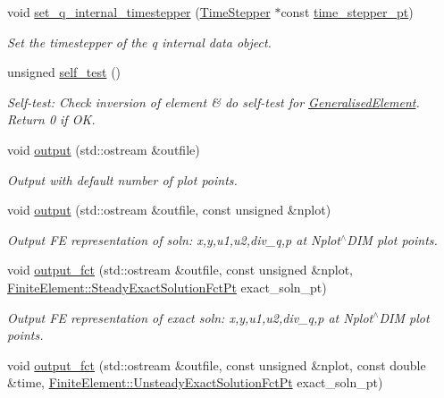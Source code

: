 \begin{DoxyCompactItemize}
void \hyperlink{classoomph_1_1PoroelasticityEquations_a9fe9f9e43dd7a2f93753c5d0e882b2c8}{set\+\_\+q\+\_\+internal\+\_\+timestepper} (\hyperlink{classoomph_1_1TimeStepper}{Time\+Stepper} $\ast$const \hyperlink{classoomph_1_1GeomObject_a3c92023891dd4a0e818022f467eeb7f1}{time\+\_\+stepper\+\_\+pt})
\begin{DoxyCompactList}\small\item\em Set the timestepper of the q internal data object. \end{DoxyCompactList}\item 
unsigned \hyperlink{classoomph_1_1PoroelasticityEquations_ad655780a10fff85d3d0b87738decfb4d}{self\+\_\+test} ()
\begin{DoxyCompactList}\small\item\em Self-\/test\+: Check inversion of element \& do self-\/test for \hyperlink{classoomph_1_1GeneralisedElement}{Generalised\+Element}. Return 0 if OK. \end{DoxyCompactList}\item 
void \hyperlink{classoomph_1_1PoroelasticityEquations_ad5814c1fe98f24ded82b5f9b50fa1fb1}{output} (std\+::ostream \&outfile)
\begin{DoxyCompactList}\small\item\em Output with default number of plot points. \end{DoxyCompactList}\item 
void \hyperlink{classoomph_1_1PoroelasticityEquations_aa7a99329f02fc199b45e8f1db6b1b0c0}{output} (std\+::ostream \&outfile, const unsigned \&nplot)
\begin{DoxyCompactList}\small\item\em Output FE representation of soln\+: x,y,u1,u2,div\+\_\+q,p at Nplot$^\wedge$\+D\+IM plot points. \end{DoxyCompactList}\item 
void \hyperlink{classoomph_1_1PoroelasticityEquations_a11af50ce3426539de63b8efe57a5fa4c}{output\+\_\+fct} (std\+::ostream \&outfile, const unsigned \&nplot, \hyperlink{classoomph_1_1FiniteElement_a690fd33af26cc3e84f39bba6d5a85202}{Finite\+Element\+::\+Steady\+Exact\+Solution\+Fct\+Pt} exact\+\_\+soln\+\_\+pt)
\begin{DoxyCompactList}\small\item\em Output FE representation of exact soln\+: x,y,u1,u2,div\+\_\+q,p at Nplot$^\wedge$\+D\+IM plot points. \end{DoxyCompactList}\item 
void \hyperlink{classoomph_1_1PoroelasticityEquations_af6ff5d6c420bb061faab9faedfa02938}{output\+\_\+fct} (std\+::ostream \&outfile, const unsigned \&nplot, const double \&time, \hyperlink{classoomph_1_1FiniteElement_ad4ecf2b61b158a4b4d351a60d23c633e}{Finite\+Element\+::\+Unsteady\+Exact\+Solution\+Fct\+Pt} exact\+\_\+soln\+\_\+pt)

\end{DoxyCompactItemize}
